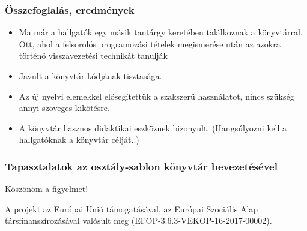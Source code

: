 \documentclass[11pt]{beamer}
\begin{document}
\begin{frame}
	\frametitle{Összefoglalás, eredmények}
	\begin{itemize}
		\item Ma már a hallgatók egy másik tantárgy keretében találkoznak a könyvtárral. Ott, ahol a felsorolós programozási tételek megismerése után az azokra történő visszavezetési technikát tanulják
		\item Javult a könyvtár kódjának tisztasága.
		\item Az új nyelvi elemekkel elősegítettük a szakszerű használatot, nincs szükség annyi szöveges kikötésre.
		\item A könyvtár hasznos didaktikai eszköznek bizonyult. (Hangsúlyozni kell a hallgatóknak a könyvtár célját..)
	\end{itemize}
\end{frame}

\begin{frame}
	\frametitle{Tapasztalatok az osztály-sablon könyvtár bevezetésével}
	\begin{center}
		\Large{Köszönöm a figyelmet!}
	
	\vspace*{25px}
	{\small A projekt az Európai Unió támogatásával, az Európai Szociális Alap társfinanszírozásával valósult meg (EFOP-3.6.3-VEKOP-16-2017-00002).}\end{center}
\end{frame}
\end{document}
